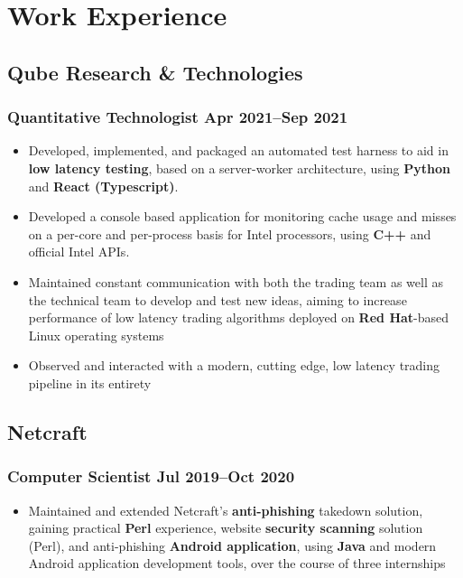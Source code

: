 \documentclass[a4paper]{article}
\begin{document}
\section*{Work Experience}
\subsection*{Qube Research \& Technologies}
\subsubsection*{Quantitative Technologist \hfill Apr 2021--Sep 2021}
\begin{itemize}
	\item Developed, implemented, and packaged an automated test harness to aid in \textbf{low
	latency testing}, based on a server-worker architecture, using \textbf{Python}
	and \textbf{React (Typescript)}.
	\item Developed a console based application for monitoring cache usage and misses on a
	per-core and per-process basis for Intel processors, using \textbf{C++} and official Intel APIs.
	\item Maintained constant communication with both the trading team as well as the technical team
	to develop and test new ideas, aiming to increase performance of low latency trading algorithms
	deployed on \textbf{Red Hat}-based Linux operating systems
	\item Observed and interacted with a modern, cutting edge, low latency trading pipeline in its
	entirety
\end{itemize}

\subsection*{Netcraft}
\subsubsection*{Computer Scientist \hfill Jul 2019--Oct 2020}
\begin{itemize}
	\item Maintained and extended Netcraft's \textbf{anti-phishing} takedown
	solution, gaining practical \textbf{Perl} experience, website \textbf{security scanning}
	solution (Perl), and anti-phishing \textbf{Android application}, using \textbf{Java}
	and modern Android application development tools, over the course of three internships
\end{itemize}
\end{document}
